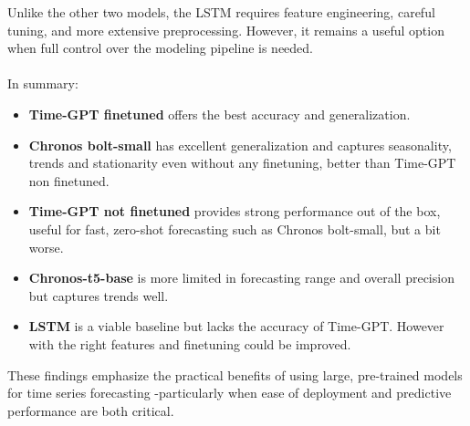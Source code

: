 \documentclass{article}
\begin{document}
Unlike the other two models, the LSTM requires feature engineering, careful tuning, and more extensive preprocessing. However, it remains a useful option when full control over the modeling pipeline is needed.\\
\\
In summary:
\begin{itemize}
    \item \textbf{Time-GPT finetuned} offers the best accuracy and generalization.
\end{itemize}
\begin{itemize}
    \item \textbf{Chronos bolt-small} has excellent generalization and captures seasonality, trends and stationarity even without any finetuning, better than Time-GPT non finetuned.
\end{itemize}
\begin{itemize}
    \item \textbf{Time-GPT not finetuned} provides strong performance out of the box, useful for fast, zero-shot forecasting such as Chronos bolt-small, but a bit worse.
\end{itemize}
\begin{itemize}
    \item \textbf{Chronos-t5-base} is more limited in forecasting range and overall precision but captures trends well.
\end{itemize}
\begin{itemize}
    \item \textbf{LSTM} is a viable baseline but lacks the accuracy of Time-GPT. However with the right features and finetuning could be improved.
\end{itemize}
 
 These findings emphasize the practical benefits of using large, pre-trained models for time series forecasting -particularly when ease of deployment and predictive performance are both critical.
 
\newpage


\nocite{*}
\end{document}
